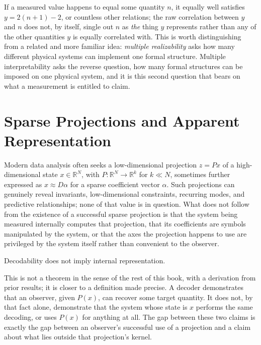 If a measured value happens to equal some quantity $n$, it equally well
satisfies $y = 2(n+1) - 2$, or countless other relations; the raw
correlation between $y$ and $n$ does not, by itself, single out $n$ as
\emph{the} thing $y$ represents rather than any of the other quantities
$y$ is equally correlated with. This is worth distinguishing from a
related and more familiar idea: \emph{multiple realizability} asks how
many different physical systems can implement one formal structure.
Multiple interpretability asks the reverse question, how many formal
structures can be imposed on one physical system, and it is this second
question that bears on what a measurement is entitled to claim.

\section{Sparse Projections and Apparent Representation}

Modern data analysis often seeks a low-dimensional projection $z = Px$ of
a high-dimensional state $x \in \mathbb{R}^N$, with $P: \mathbb{R}^N \to
\mathbb{R}^k$ for $k \ll N$, sometimes further expressed as $x \approx
D\alpha$ for a sparse coefficient vector $\alpha$. Such projections can
genuinely reveal invariants, low-dimensional constraints, recurring modes,
and predictive relationships; none of that value is in question. What
does not follow from the existence of a successful sparse projection is
that the system being measured internally computes that projection, that
its coefficients are symbols manipulated by the system, or that the axes
the projection happens to use are privileged by the system itself rather
than convenient to the observer.

\begin{theorem}
Decodability does not imply internal representation.
\end{theorem}

This is not a theorem in the sense of the rest of this book, with a
derivation from prior results; it is closer to a definition made precise.
A decoder demonstrates that an observer, given $P(x)$, can recover some
target quantity. It does not, by that fact alone, demonstrate that the
system whose state is $x$ performs the same decoding, or uses $P(x)$ for
anything at all. The gap between these two claims is exactly the gap
between an observer's successful use of a projection and a claim about
what lies outside that projection's kernel.

